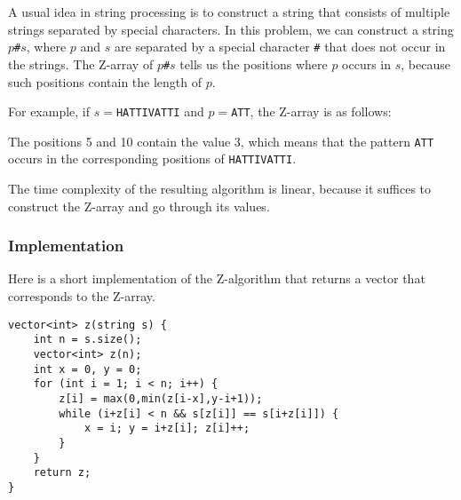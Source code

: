 A usual idea in string processing is to
construct a string that consists of
multiple strings separated by special characters.
In this problem, we can construct a string
$p$\texttt{\#}$s$,
where $p$ and $s$ are separated by a special
character \texttt{\#} that does not occur
in the strings.
The Z-array of $p$\texttt{\#}$s$ tells us the positions
where $p$ occurs in $s$,
because such positions contain the length of $p$.

For example, if $s=$\texttt{HATTIVATTI} and $p=$\texttt{ATT},
the Z-array is as follows:

\begin{center}
\end{center}

The positions 5 and 10 contain the value 3,
which means that the pattern \texttt{ATT}
occurs in the corresponding positions
of \texttt{HATTIVATTI}.

The time complexity of the resulting algorithm
is linear, because it suffices to construct
the Z-array and go through its values.

\subsubsection{Implementation}

Here is a short implementation of the Z-algorithm
that returns a vector that corresponds to the Z-array.

\begin{lstlisting}
vector<int> z(string s) {
    int n = s.size();
    vector<int> z(n);
    int x = 0, y = 0;
    for (int i = 1; i < n; i++) {
        z[i] = max(0,min(z[i-x],y-i+1));
        while (i+z[i] < n && s[z[i]] == s[i+z[i]]) {
            x = i; y = i+z[i]; z[i]++;
        }
    }
    return z;
}
\end{lstlisting}